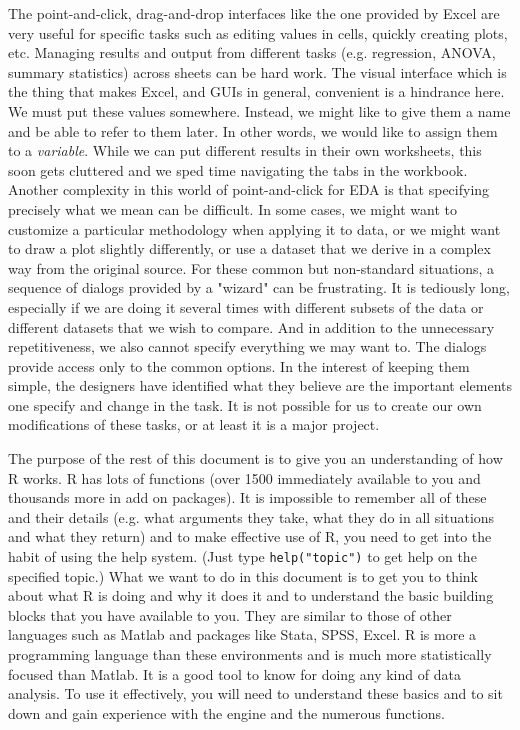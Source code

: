  The point-and-click, drag-and-drop interfaces like the one provided by Excel are very useful for specific tasks such as editing values in cells, quickly creating plots, etc. Managing results and output from different tasks (e.g. regression, ANOVA, summary statistics) across sheets can be hard work. The visual interface which is the thing that makes Excel, and GUIs in general, convenient is a hindrance here. We must put these values somewhere. Instead, we might like to give them a name and be able to refer to them later. In other words, we would like to assign them to a {\em{variable}}. While we can put different results in their own worksheets, this soon gets cluttered and we sped time navigating the tabs in the workbook. Another complexity in this world of point-and-click for EDA is that specifying precisely what we mean can be difficult. In some cases, we might want to customize a particular methodology when applying it to data, or we might want to draw a plot slightly differently, or use a dataset that we derive in a complex way from the original source. For these common but non-standard situations, a sequence of dialogs provided by a "wizard" can be frustrating. It is tediously long, especially if we are doing it several times with different subsets of the data or different datasets that we wish to compare. And in addition to the unnecessary repetitiveness, we also cannot specify everything we may want to. The dialogs provide access only to the common options. In the interest of keeping them simple, the designers have identified what they believe are the important elements one specify and change in the task. It is not possible for us to create our own modifications of these tasks, or at least it is a major project. 

 The purpose of the rest of this document is to give you an understanding of how R works. R has lots of functions (over 1500 immediately available to you and thousands more in add on packages). It is impossible to remember all of these and their details (e.g. what arguments they take, what they do in all situations and what they return) and to make effective use of R, you need to get into the habit of using the help system. (Just type \verb|help("topic")| to get help on the specified topic.) What we want to do in this document is to get you to think about what R is doing and why it does it and to understand the basic building blocks that you have available to you. They are similar to those of other languages such as Matlab and packages like Stata, SPSS, Excel. R is more a programming language than these environments and is much more statistically focused than Matlab. It is a good tool to know for doing any kind of data analysis. To use it effectively, you will need to understand these basics and to sit down and gain experience with the engine and the numerous functions.

